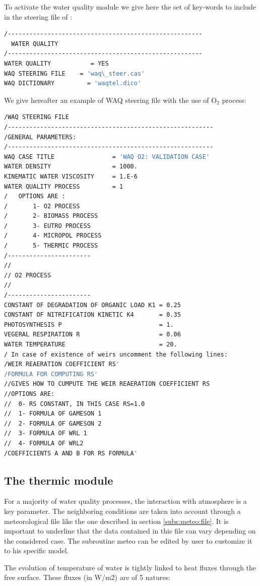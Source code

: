  To activate the water quality module we give here the set of key-words to include in the steering file of :
\begin{lstlisting}[language=bash]
/------------------------------------------------------
  WATER QUALITY
/------------------------------------------------------
WATER QUALITY           = YES
WAQ STEERING FILE    = 'waq\_steer.cas'
WAQ DICTIONARY         = 'waqtel.dico'
\end{lstlisting}
We give hereafter an example of WAQ steering file with the use of O${}_{2}$ process:
\begin{lstlisting}[language=bash]
/WAQ STEERING FILE
/---------------------------------------------------------
/GENERAL PARAMETERS:
/---------------------------------------------------------
WAQ CASE TITLE                = 'WAQ O2: VALIDATION CASE'
WATER DENSITY                 = 1000.
KINEMATIC WATER VISCOSITY     = 1.E-6
WATER QUALITY PROCESS         = 1
/   OPTIONS ARE :
/       1- O2 PROCESS
/       2- BIOMASS PROCESS
/       3- EUTRO PROCESS
/       4- MICROPOL PROCESS
/       5- THERMIC PROCESS
/-----------------------
//
// O2 PROCESS
//
/-----------------------
CONSTANT OF DEGRADATION OF ORGANIC LOAD K1 = 0.25
CONSTANT OF NITRIFICATION KINETIC K4       = 0.35
PHOTOSYNTHESIS P                           = 1.
VEGERAL RESPIRATION R                      = 0.06
WATER TEMPERATURE                          = 20.
/ In case of existence of weirs uncomment the following lines:
/WEIR REAERATION COEFFICIENT RS'
/FORMULA FOR COMPUTING RS'
//GIVES HOW TO CUMPUTE THE WEIR REAERATION COEFFICIENT RS
//OPTIONS ARE:
//  0- RS CONSTANT, IN THIS CASE RS=1.0
//  1- FORMULA OF GAMESON 1
//  2- FORMULA OF GAMESON 2
//  3- FORMULA OF WRL 1
//  4- FORMULA OF WRL2
/COEFFICIENTS A AND B FOR RS FORMULA'
\end{lstlisting}

\subsection{ The thermic module}
\label{subs:therm:mod}
 For a majority of water quality processes, the interaction with atmosphere is a key parameter. The neighboring conditions are taken into account through a meteorological file like the one described in section \ref{subs:meteo:file}. It is important to underline that the data contained in this file can vary depending on the considered case. The subroutine meteo can be edited by user to customize it to his specific model.

 The evolution of temperature of water is tightly linked to heat fluxes through the free surface. These fluxes (in W/m2) are of 5 natures:

